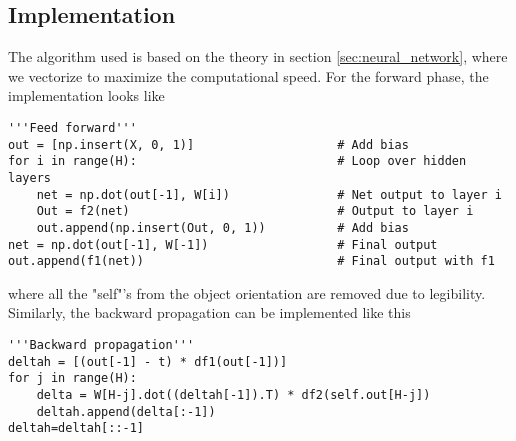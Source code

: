 \subsection{Implementation}
The algorithm used is based on the theory in section \ref{sec:neural_network}, where we vectorize to maximize the computational speed. For the forward phase, the implementation looks like
\lstset{basicstyle=\scriptsize}
\begin{lstlisting}
'''Feed forward'''
out = [np.insert(X, 0, 1)]  	              # Add bias
for i in range(H):     		                  # Loop over hidden layers
	net = np.dot(out[-1], W[i])     		  # Net output to layer i
	Out = f2(net)                        	  # Output to layer i
	out.append(np.insert(Out, 0, 1))     	  # Add bias
net = np.dot(out[-1], W[-1])        		  # Final output
out.append(f1(net))                 		  # Final output with f1
\end{lstlisting}
where all the "self"'s from the object orientation are removed due to legibility. Similarly, the backward propagation can be implemented like this
\begin{lstlisting}
'''Backward propagation'''
deltah = [(out[-1] - t) * df1(out[-1])]
for j in range(H):
	delta = W[H-j].dot((deltah[-1]).T) * df2(self.out[H-j])
	deltah.append(delta[:-1])
deltah=deltah[::-1]
\end{lstlisting}